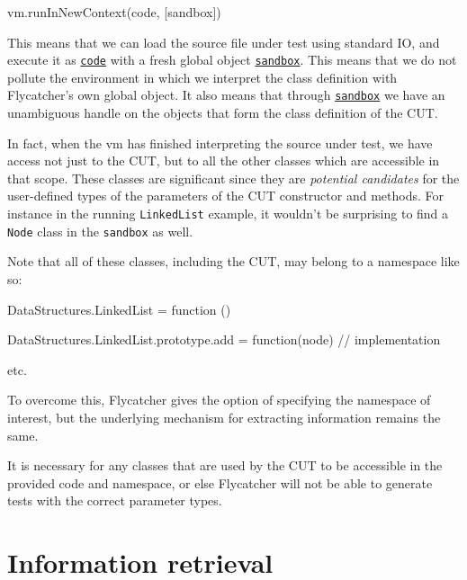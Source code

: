 \begin{code}
   vm.runInNewContext(code, [sandbox])
\end{code}

This means that we can load the source file under test using standard IO, and execute it as \texttt{\underline{code}} with a fresh global object \texttt{\underline{sandbox}}. This means that we do not pollute the environment in which we interpret the class definition with \textsf{Flycatcher}'s own global object. It also means that through \texttt{\underline{sandbox}} we have an unambiguous handle on the objects that form the class definition of the CUT.

In fact, when the vm has finished interpreting the source under test, we have access not just to the CUT, but to all the other classes which are accessible in that scope. These classes are significant since they are \emph{potential candidates} for the user-defined types of the parameters of the CUT constructor and methods. For instance in the running \texttt{LinkedList} example, it wouldn't be surprising to find a \texttt{Node} class in the \texttt{sandbox} as well.

Note that all of these classes, including the CUT, may belong to a namespace like so:

\begin{code}[caption=Namespaces,label=ns]
DataStructures.LinkedList = function () {
}

DataStructures.LinkedList.prototype.add = function(node) {
   // implementation
}

etc.
\end{code}

To overcome this, \textsf{Flycatcher} gives the option of specifying the namespace of interest, but the underlying mechanism for extracting information remains the same.


It is necessary for any classes that are used by the CUT to be accessible in the provided code and namespace, or else \textsf{Flycatcher} will not be able to generate tests with the correct parameter types.

\section{Information retrieval}
